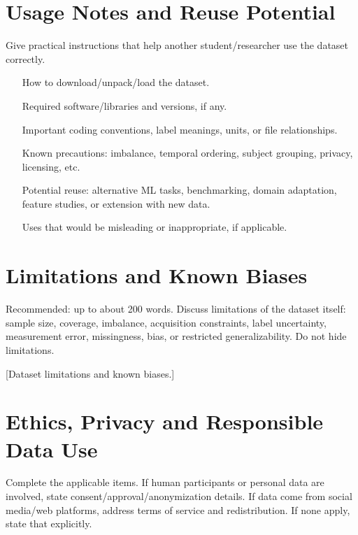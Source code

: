 \documentclass[11pt,a4paper]{article}
\begin{document}
\vspace{1.5em}

\section{Usage Notes and Reuse Potential}
Give practical instructions that help another student/researcher use the dataset correctly.
\begin{itemize}[leftmargin=1.5em, itemsep=2pt, topsep=2pt]
    \item [How to download/unpack/load the dataset.]
    \item [Required software/libraries and versions, if any.]
    \item [Important coding conventions, label meanings, units, or file relationships.]
    \item [Known precautions: imbalance, temporal ordering, subject grouping, privacy, licensing, etc.]
    \item [Potential reuse: alternative ML tasks, benchmarking, domain adaptation, feature studies, or extension with new data.]
    \item [Uses that would be misleading or inappropriate, if applicable.]
\end{itemize}

\vspace{1.5em}

\section{Limitations and Known Biases}
Recommended: up to about 200 words. Discuss limitations of the dataset itself: sample size, coverage, imbalance, acquisition constraints, label uncertainty, measurement error, missingness, bias, or restricted generalizability. Do not hide limitations.

[Dataset limitations and known biases.]

\vspace{1.5em}

\section{Ethics, Privacy and Responsible Data Use}
Complete the applicable items. If human participants or personal data are involved, state consent/approval/anonymization details. If data come from social media/web platforms, address terms of service and redistribution. If none apply, state that explicitly.
\end{document}
